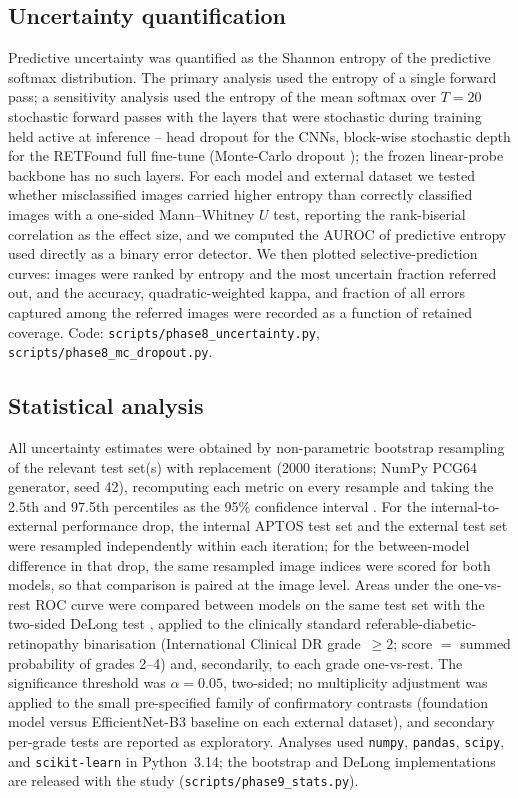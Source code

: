 \documentclass[11pt,a4paper]{article}
\begin{document}
\subsection{Uncertainty quantification}
Predictive uncertainty was quantified as the Shannon entropy of the predictive
softmax distribution. The primary analysis used the entropy of a single forward
pass; a sensitivity analysis used the entropy of the mean softmax over $T=20$
stochastic forward passes with the layers that were stochastic during training
held active at inference -- head dropout for the CNNs, block-wise stochastic depth
for the RETFound full fine-tune (Monte-Carlo dropout \citep{gal2016dropout}); the
frozen linear-probe backbone has no such layers. For each model and external dataset we tested whether
misclassified images carried higher entropy than correctly classified images
with a one-sided Mann--Whitney $U$ test, reporting the rank-biserial correlation
as the effect size, and we computed the AUROC of predictive entropy used
directly as a binary error detector. We then plotted selective-prediction
curves: images were ranked by entropy and the most uncertain fraction referred
out, and the accuracy, quadratic-weighted kappa, and fraction of all errors
captured among the referred images were recorded as a function of retained
coverage. Code: \texttt{scripts/phase8\_uncertainty.py},
\texttt{scripts/phase8\_mc\_dropout.py}.

\subsection{Statistical analysis}
All uncertainty estimates were obtained by non-parametric bootstrap resampling of
the relevant test set(s) with replacement (\num{2000} iterations; NumPy PCG64
generator, seed 42), recomputing each metric on every resample and taking the
2.5th and 97.5th percentiles as the 95\% confidence interval
\citep{efron1994bootstrap}. For the internal-to-external performance drop, the
internal APTOS test set and the external test set were resampled independently
within each iteration; for the between-model difference in that drop, the same
resampled image indices were scored for both models, so that comparison is paired
at the image level. Areas under the one-vs-rest ROC curve were compared between
models on the same test set with the two-sided DeLong test
\citep{delong1988,sun2014fast}, applied to the clinically standard
referable-diabetic-retinopathy binarisation (International Clinical DR
grade~$\geq 2$; score $=$ summed probability of grades 2--4) and, secondarily, to
each grade one-vs-rest. The significance threshold was $\alpha = 0.05$,
two-sided; no multiplicity adjustment was applied to the small pre-specified
family of confirmatory contrasts (foundation model versus EfficientNet-B3
baseline on each external dataset), and secondary per-grade tests are reported as
exploratory. Analyses used \texttt{numpy}, \texttt{pandas}, \texttt{scipy}, and
\texttt{scikit-learn} in Python~3.14; the bootstrap and DeLong implementations
are released with the study (\texttt{scripts/phase9\_stats.py}).
\end{document}
